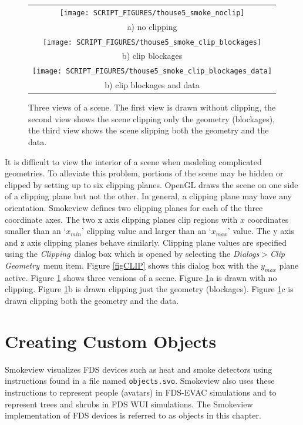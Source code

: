 \documentclass[11pt,twoside]{book}
\begin{document}
\begin{figure}[\figoptions]
\begin{center}
\begin{tabular}{c}
\texttt{[image: SCRIPT\_FIGURES/thouse5\_smoke\_noclip]}\\
a) no clipping\\
\texttt{[image: SCRIPT\_FIGURES/thouse5\_smoke\_clip\_blockages]}\\
b) clip blockages\\
\texttt{[image: SCRIPT\_FIGURES/thouse5\_smoke\_clip\_blockages\_data]}\\
b) clip blockages and data\\
\end{tabular}
\end{center}
\caption[Clipping a scene.]{Three views of a scene. The first view
is drawn without clipping, the second view shows the scene
clipping only the geometry (blockages), the third view shows the
scene slipping both the geometry and the data.} \label{figCLIPPED}
\end{figure}

It is difficult to view the interior of a scene when modeling
complicated geometries.  To alleviate this problem, portions of
the scene may be hidden or clipped by setting up to six clipping
planes. OpenGL draws the scene on one side of a clipping plane but
not the other. In general, a clipping plane may have any
orientation. Smokeview defines two clipping planes for each of the
three coordinate axes.   The two x axis clipping planes clip
regions with $x$ coordinates smaller than an `$x_{min}$' clipping
value and larger than an `$x_{max}$' value. The y axis and z axis
clipping planes behave similarly.  Clipping plane values are
specified using the {\em Clipping}\ dialog box which is opened by
selecting the {\em Dialogs$>$Clip Geometry}\ menu item. Figure
\ref{figCLIP} shows this dialog box with the $y_{max}$ plane
active. Figure \ref{figCLIPPED} shows three versions of a scene.
Figure \ref{figCLIPPED}a is drawn with no clipping. Figure
\ref{figCLIPPED}b is drawn clipping just the geometry (blockages).
Figure \ref{figCLIPPED}c is drawn clipping both the geometry and
the data.


\chapter{Creating Custom Objects}
\label{chap:devices} Smokeview visualizes FDS devices such as heat and smoke detectors using instructions found in a file named {\tt objects.svo}. Smokeview also uses these instructions to represent people (avatars) in FDS-EVAC simulations and to represent trees and shrubs in FDS WUI simulations. The
Smokeview implementation of FDS devices is referred to as objects in this chapter.
\end{document}
